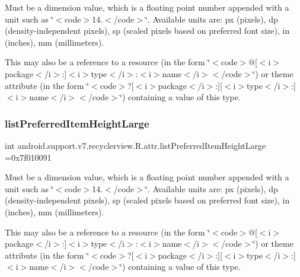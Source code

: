 Must be a dimension value, which is a floating point number appended with a unit such as \char`\"{}$<$code$>$14.\+5sp$<$/code$>$\char`\"{}. Available units are\+: px (pixels), dp (density-\/independent pixels), sp (scaled pixels based on preferred font size), in (inches), mm (millimeters). 

This may also be a reference to a resource (in the form \char`\"{}$<$code$>$@\mbox{[}$<$i$>$package$<$/i$>$\+:\mbox{]}$<$i$>$type$<$/i$>$\+:$<$i$>$name$<$/i$>$$<$/code$>$\char`\"{}) or theme attribute (in the form \char`\"{}$<$code$>$?\mbox{[}$<$i$>$package$<$/i$>$\+:\mbox{]}\mbox{[}$<$i$>$type$<$/i$>$\+:\mbox{]}$<$i$>$name$<$/i$>$$<$/code$>$\char`\"{}) containing a value of this type. \mbox{\label{classandroid_1_1support_1_1v7_1_1recyclerview_1_1R_1_1attr_a651be73dd0c709da9b500cd15bde3f16}} 
\subsubsection{\texorpdfstring{list\+Preferred\+Item\+Height\+Large}{listPreferredItemHeightLarge}}
{\footnotesize\ttfamily int android.\+support.\+v7.\+recyclerview.\+R.\+attr.\+list\+Preferred\+Item\+Height\+Large =0x7f010091\hspace{0.3cm}{\ttfamily [static]}}

Must be a dimension value, which is a floating point number appended with a unit such as \char`\"{}$<$code$>$14.\+5sp$<$/code$>$\char`\"{}. Available units are\+: px (pixels), dp (density-\/independent pixels), sp (scaled pixels based on preferred font size), in (inches), mm (millimeters). 

This may also be a reference to a resource (in the form \char`\"{}$<$code$>$@\mbox{[}$<$i$>$package$<$/i$>$\+:\mbox{]}$<$i$>$type$<$/i$>$\+:$<$i$>$name$<$/i$>$$<$/code$>$\char`\"{}) or theme attribute (in the form \char`\"{}$<$code$>$?\mbox{[}$<$i$>$package$<$/i$>$\+:\mbox{]}\mbox{[}$<$i$>$type$<$/i$>$\+:\mbox{]}$<$i$>$name$<$/i$>$$<$/code$>$\char`\"{}) containing a value of this type. \mbox{\label{classandroid_1_1support_1_1v7_1_1recyclerview_1_1R_1_1attr_aab7ea89f4acd694a8ac4b8dae22a0ef5}} 
